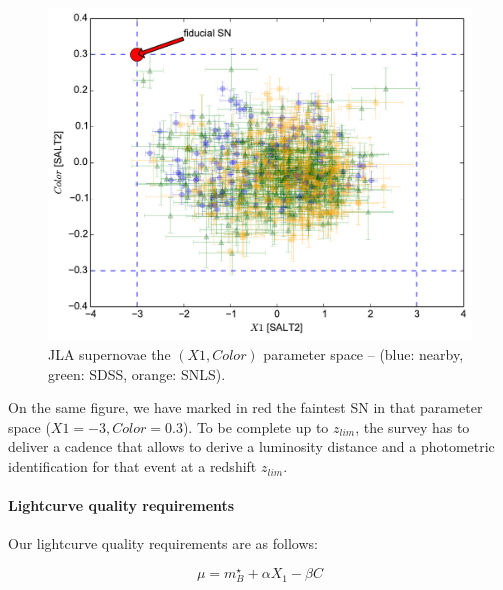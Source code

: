 \documentclass[\docopts]{\docclass}
\begin{document}
\begin{figure}[t]
\begin{center}
\includegraphics[width=0.75\linewidth]{sn_parameter_space.pdf}
\caption{JLA supernovae the $(X1,Color)$ parameter space -- (blue:
  nearby, green: SDSS, orange: SNLS).  }
\label{fig:jla_X1_C}
\end{center}
\end{figure}

On the same figure, we have marked in red the faintest SN in that
parameter space ($X1=-3, Color=0.3$). To be complete up to $z_{lim}$,
the survey has to deliver a cadence that allows to derive a luminosity
distance and a photometric identification for that event at a redshift
$z_{lim}$.

\paragraph{Lightcurve quality requirements} Our lightcurve quality
requirements are as follows:

\begin{equation}
  \mu = m^\star_B + \alpha X_1 - \beta C
\end{equation}
\end{document}
